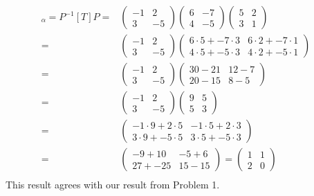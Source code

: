 \documentclass[12pt]{article}
\newenvironment{problem}[2][Problem]
{
	\begin{trivlist} 
		\item[\hskip \labelsep {\bfseries #1 #2:}]
	}
{
	\end{trivlist}
	}
\newenvironment{solution}[1][Solution]
{
	\begin{trivlist} 
		\item[\hskip \labelsep {\itshape #1:}]
	}
	{
	\end{trivlist}
}
\begin{document}
\begin{problem}{2}
\begin{solution}
\begin{align*}
[T]_{\alpha} = P^{-1} [T]P =&\begin{pmatrix} -1 & 2 \\ 3&-5\end{pmatrix} \begin{pmatrix}6&-7\\4&-5\end{pmatrix}  \begin{pmatrix}5&2\\3&1\end{pmatrix} & \\
=& \begin{pmatrix} -1 & 2 \\ 3&-5\end{pmatrix} \begin{pmatrix}6\cdot 5 + -7 \cdot 3 &6\cdot 2 + -7\cdot 1\\4\cdot 5 + -5 \cdot 3&4\cdot 2 + -5\cdot 1\end{pmatrix} & \\
=& \begin{pmatrix} -1 & 2 \\ 3&-5\end{pmatrix} \begin{pmatrix}30-21 &12  -7\\20 -15&8-5\end{pmatrix} & \\
=& \begin{pmatrix} -1 & 2 \\ 3&-5\end{pmatrix} \begin{pmatrix}9 &5\\5&3\end{pmatrix} & \\
=& \begin{pmatrix} -1\cdot 9 + 2\cdot 5&-1 \cdot 5 + 2\cdot 3 \\ 3\cdot 9 + -5\cdot 5&3\cdot 5 + -5\cdot 3\end{pmatrix} & \\
=& \begin{pmatrix} -9 + 10&-5 + 6 \\ 27 + -25&15 -15\end{pmatrix} =\begin{pmatrix} 1&1\\ 2&0\end{pmatrix}  & \\
\end{align*}
This result agrees with our result from Problem 1.
\end{solution}
\end{problem}
\end{document}
